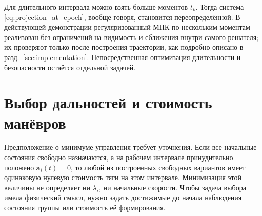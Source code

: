 \documentclass[a4paper,12pt]{article}
\begin{document}
Для длительного интервала можно взять больше моментов $t_k$.
Тогда система \eqref{eq:projection_at_epoch}, вообще говоря,
становится переопределённой. В действующей демонстрации
регуляризованный МНК по нескольким моментам реализован без
ограничений на видимость и сближения внутри самого решателя;
их проверяют только после построения траектории, как подробно
описано в разд.~\ref{sec:implementation}. Непосредственная
оптимизация длительности и безопасности остаётся отдельной задачей.

\section{Выбор дальностей и стоимость манёвров}

Предположение о минимуме управления требует уточнения. Если все начальные состояния свободно назначаются, а на рабочем интервале принудительно положено $\mathbf a_i(t)=0$, то любой из построенных свободных вариантов имеет одинаковую нулевую стоимость тяги на этом интервале. Минимизация этой величины не определяет ни $\lambda_i$, ни начальные скорости. Чтобы задача выбора имела физический смысл, нужно задать достижимые до начала наблюдения состояния группы или стоимость её формирования.
\end{document}
